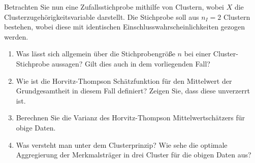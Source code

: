 \documentclass{article}
\begin{document}
Betrachten Sie nun eine Zufallsstichprobe mithilfe von Clustern, wobei $X$ die Clusterzugehörigkeitsvariable darstellt. Die Stichprobe soll aus $n_I = 2$ Clustern bestehen, wobei diese mit identischen Einschlusswahrscheinlichkeiten gezogen werden.
\begin{enumerate}
	\item Was lässt sich allgemein über die Stichprobengröße $n$ bei einer Cluster-Stichprobe aussagen? Gilt dies auch in dem vorliegenden Fall?
	\item  Wie ist die Horvitz-Thompson Schätzfunktion für den Mittelwert der Grundgesamtheit in diesem Fall definiert? Zeigen Sie, dass diese unverzerrt ist.
	\item Berechnen Sie die Varianz des Horvitz-Thompson Mittelwertschätzers für obige Daten.
	\item Was versteht man unter dem Clusterprinzip? Wie sehe die optimale Aggregierung der Merkmalsträger in drei Cluster für die obigen Daten aus? 
\end{enumerate}
\end{document}
